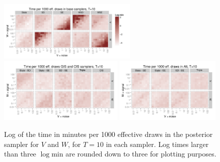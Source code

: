 \documentclass{article}
\begin{document}
\begin{figure}[!h]
\centering
\includegraphics[width=0.59\textwidth]{basecistimeplot10}
\includegraphics[width=0.53\textwidth]{altgisVtimeplot10}
\includegraphics[width=0.45\textwidth]{altgisWtimeplot10}
\caption{Log of the time in minutes per 1000 effective draws in the posterior sampler for $V$ and $W$, for $T=10$ in each sampler. Log times larger than three $\log \mathrm{min}$ are rounded down to three for plotting purposes.}
\label{baseinttimeplot1}
\end{figure}
\end{document}
